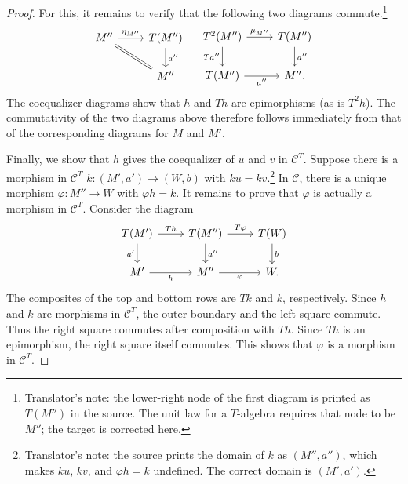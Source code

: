 \begin{proof}
	For this, it remains to verify that the following two diagrams
	commute.\footnote{Translator's note: the lower-right node of the first
	diagram is printed as $T(M'')$ in the source. The unit law for a
	$T$-algebra requires that node to be $M''$; the target is corrected here.}
	\[\begin{tikzcd}
		M'' \arrow[r, "{\eta_{M''}}"] \arrow[equal, rd] & T(M'') \arrow[d, "{a''}"] \\
		& M''
	\end{tikzcd} \quad
	\begin{tikzcd}
		T^2(M'') \arrow[r, "{\mu_{M''}}"] \arrow[d, "{Ta''}"'] & T(M'') \arrow[d, "{a''}"] \\
		T(M'') \arrow[r, "{a''}"'] & M'' .
	\end{tikzcd}\]
	The coequalizer diagrams show that $h$ and $Th$ are epimorphisms (as is
	$T^2h$). The commutativity of the two diagrams above therefore follows
	immediately from that of the corresponding diagrams for $M$ and $M'$.

	Finally, we show that $h$ gives the coequalizer of $u$ and $v$ in
	$\mathcal{C}^T$. Suppose there is a morphism in $\mathcal{C}^T$
	$k:(M',a')\to(W,b)$ with $ku=kv$.\footnote{Translator's note: the source
	prints the domain of $k$ as $(M'',a'')$, which makes $ku$, $kv$, and
	$\varphi h=k$ undefined. The correct domain is $(M',a')$.} In
	$\mathcal{C}$, there is a unique morphism $\varphi:M''\to W$ with
	$\varphi h=k$. It remains to prove that $\varphi$ is actually a morphism
	in $\mathcal{C}^T$. Consider the diagram
	\[\begin{tikzcd}
		T(M') \arrow[r, "Th"] \arrow[d, "{a'}"'] & T(M'') \arrow[r, "T\varphi"] \arrow[d, "{a''}"] & T(W) \arrow[d, "b"] \\
		M' \arrow[r, "h"'] & M'' \arrow[r, "\varphi"'] & W.
	\end{tikzcd}\]
	The composites of the top and bottom rows are $Tk$ and $k$, respectively.
	Since $h$ and $k$ are morphisms in $\mathcal{C}^T$, the outer boundary and
	the left square commute. Thus the right square commutes after composition
	with $Th$. Since $Th$ is an epimorphism, the right square itself commutes.
	This shows that $\varphi$ is a morphism in $\mathcal{C}^T$.
\end{proof}


